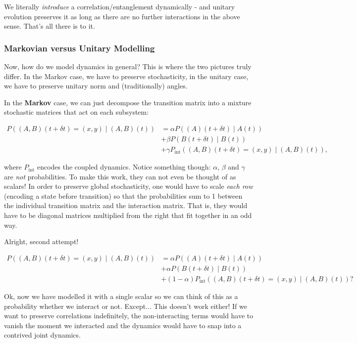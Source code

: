 \documentclass{article}
\begin{document}
We literally \textit{introduce} a correlation/entanglement dynamically - and unitary evolution preserves it as long as there are no further interactions in the above sense. That's all there is to it.

\subsubsection{Markovian versus Unitary Modelling}

Now, how do we model dynamics in general? This is where the two pictures truly differ. In the Markov case, we have to preserve stochasticity, in the unitary case, we have to preserve unitary norm and (traditionally) angles.

In the \textbf{Markov} case, we can just decompose the transition matrix into a mixture stochastic matrices that act on each subsystem:

\begin{align*}
 P((A,B)(t+\delta t) = (x,y)\mid (A,B)(t)) &= \alpha P((A)(t + \delta t)\mid A(t))\\ & + \beta P(B(t+\delta t) \mid B(t)) \\ & + \gamma P_{\operatorname{int}}((A,B)(t+\delta t) = (x,y)\mid (A,B)(t)), 
\end{align*}

where $P_{\operatorname{int}}$ encodes the coupled dynamics. Notice something though: $\alpha$, $\beta$ and $\gamma$ are \textit{not} probabilities. To make this work, they can not even be thought of as scalars! In order to preserve global stochasticity, one would have to scale \textit{each row} (encoding a state before transition) so that the probabilities sum to 1 between the individual transition matrix and the interaction matrix. That is, they would have to be diagonal matrices multiplied from the right that fit together in an odd way.

Alright, second attempt!

\begin{align*}
 P((A,B)(t+\delta t) = (x,y)\mid (A,B)(t)) &= \alpha P((A)(t + \delta t)\mid A(t))\\ & + \alpha P(B(t+\delta t) \mid B(t)) \\ & + (1-\alpha) P_{\operatorname{int}}((A,B)(t+\delta t) = (x,y)\mid (A,B)(t))? 
 \end{align*}

Ok, now we have modelled it with a single scalar so we can think of this as a probability whether we interact or not. Except... This doesn't work either! If we want to preserve correlations indefinitely, the non-interacting terms would have to vanish the moment we interacted and the dynamics would have to snap into a contrived joint dynamics.
\end{document}
